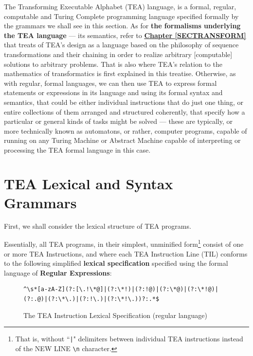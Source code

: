 \documentclass[a4paper, 18pt]{book} %
\begin{document}
The Transforming Executable Alphabet (TEA) language, is a formal, regular, computable and Turing Complete programming language specified formally by the grammars we shall see in this section. As for \textbf{the formalisms underlying the TEA language} --- its semantics, refer to \textbf{\hyperref[SECTRANSFORM]{Chapter \ref{SECTRANSFORM}}} that treats of TEA's design as a language based on the philosophy of sequence transformations and their chaining in order to realize arbitrary [computable] solutions to arbitrary problems. That is also where TEA's relation to the mathematics of transformatics is first explained in this treatise. Otherwise, as with regular, formal languages, we can then use TEA to express formal statements or expressions in its language and using its formal syntax and semantics, that could be either individual instructions that do just one thing, or entire collections of them arranged and structured coherently, that specify how a particular or general kinds of tasks might be solved --- these are typically, or more technically known as automatons, or rather, computer programs, capable of running on any Turing Machine or Abstract Machine capable of interpreting or processing the TEA formal language in this case.


\section{TEA Lexical and Syntax Grammars}
\label{SECGRAM}

First, we shall consider the lexical structure of TEA programs.

Essentially, all TEA programs, in their simplest, unminified form\footnote{That is, without 
``\texttt{|}" delimiters between individual TEA instructions  instead of the NEW LINE \texttt{\textbackslash n} character.} consist of one or more TEA Instructions, and where each TEA Instruction Line (TIL) conforms to the following simplified \textbf{lexical specification} specified using the formal language of \textbf{Regular Expressions}:



\begin{figure}[H]
  \centering
  \begin{tcolorbox}[myterminalstyle, title=TEA Instruction Line (Regular Expression)]
  \begin{lstlisting}
^\s*[a-zA-Z](?:[\.!\*@]|(?:\*!)|(?:!@)|(?:\*@)|(?:\*!@)|(?:.@)|(?:\*\.)|(?:!\.)|(?:\*!\.))?:.*$
  \end{lstlisting}
  \end{tcolorbox}
  \caption{The TEA Instruction Lexical Specification (regular language)}
  \label{FIG1}
\end{figure}
\end{document}
